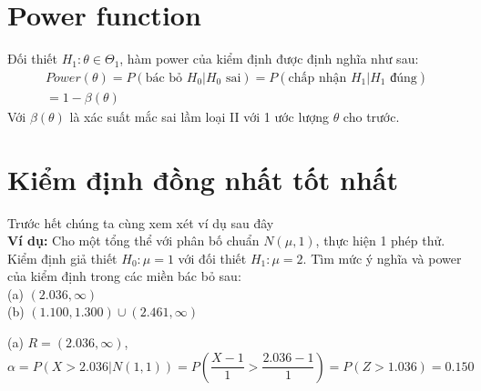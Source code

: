 \section{Power function}
Đối thiết $H_1: \theta \in \Theta_1$, hàm power của kiểm định được định nghĩa như sau:
\begin{equation}
	\begin{split}
		Power(\theta) = P(\text{bác bỏ } H_0 | H_0 \text{ sai}) = P(\text{chấp nhận } H_1 | H_1 \text{ đúng}) \\
		= 1 - \beta(\theta)
	\end{split}
\end{equation}
Với $\beta(\theta)$ là xác suất mắc sai lầm loại II với 1 ước lượng $\theta$ cho trước.

\section{Kiểm định đồng nhất tốt nhất}
Trước hết chúng ta cùng xem xét ví dụ sau đây \\
\textbf{Ví dụ: } Cho một tổng thể với phân bố chuẩn $N(\mu, 1)$, thực hiện 1 phép thử. 
Kiểm định giả thiết $H_0: \mu = 1$ với đối thiết $H_1: \mu = 2$. Tìm mức ý nghĩa và power của kiểm định 
trong các miền bác bỏ sau: \\
(a) $(2.036, \infty)$ \\
(b) $(1.100, 1.300) \cup (2.461, \infty)$

(a) $R = (2.036, \infty)$,
$$\alpha = P(X > 2.036 | N(1, 1)) = P(\frac{X-1}{1} > \frac{2.036-1}{1}) = P(Z > 1.036) = 0.150$$

